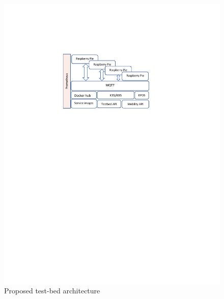 \documentclass[conference]{IEEEtran}
\begin{document}
\begin{figure}[!htbp]
\centering
\includegraphics[clip, trim=5.7cm 17.5cm 6.9cm 5cm, width=\columnwidth]{figures/arch1.pdf}
\caption{Proposed test-bed architecture}
\label{fig:arch}
\end{figure}
\end{document}
